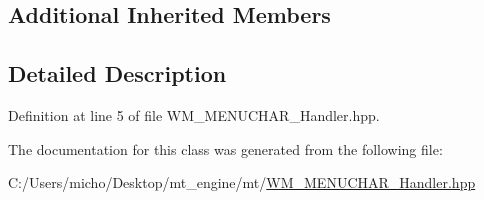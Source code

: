 \subsection*{Additional Inherited Members}


\subsection{Detailed Description}


Definition at line 5 of file W\+M\+\_\+\+M\+E\+N\+U\+C\+H\+A\+R\+\_\+\+Handler.\+hpp.



The documentation for this class was generated from the following file\+:\begin{DoxyCompactItemize}
\item 
C\+:/\+Users/micho/\+Desktop/mt\+\_\+engine/mt/\hyperlink{_w_m___m_e_n_u_c_h_a_r___handler_8hpp}{W\+M\+\_\+\+M\+E\+N\+U\+C\+H\+A\+R\+\_\+\+Handler.\+hpp}\end{DoxyCompactItemize}
